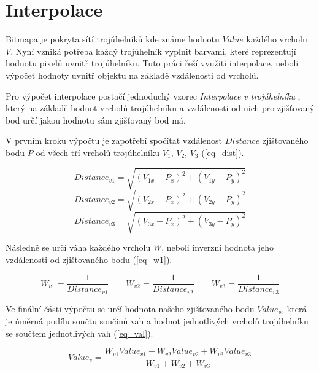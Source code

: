 \documentclass[czech,bachelor,dept460,male,csharp,cpdeclaration]{diploma}
\begin{document}
	\section{Interpolace}
	
	Bitmapa je pokryta sítí trojúhelníků kde známe hodnotu $Value$ každého vrcholu $V$. Nyní vzniká potřeba každý trojúhelník vyplnit barvami, které reprezentují hodnotu pixelů uvnitř trojúhelníku. Tuto práci řeší využití interpolace, neboli výpočet hodnoty uvnitř objektu na základě vzdálenosti od vrcholů.
	
	Pro výpočet interpolace postačí jednoduchý vzorec \emph{Interpolace v trojúhelníku} \cite{interp}, který na základě hodnot vrcholů trojúhelníku a vzdálenosti od nich pro zjišťovaný bod určí jakou hodnotu sám zjišťovaný bod má.
	
	
	V prvním kroku výpočtu je zapotřebí spočítat vzdálenost $Distance$ zjišťovaného bodu $P$ od všech tří vrcholů trojúhelníku $V_1$, $V_2$, $V_3$ (\ref{eq_dist}). 
	
	\begin{displaymath}
		Distance_{v1} =\sqrt{(V_{1x}-P_x)^2+(V_{1y}-P_y)^2}
	\end{displaymath}
	\begin{displaymath}
		Distance_{v2} =\sqrt{(V_{2x}-P_x)^2+(V_{2y}-P_y)^2}
	\end{displaymath}
	\begin{equation}\label{eq_dist}
		Distance_{v3} =\sqrt{(V_{3x}-P_x)^2+(V_{3y}-P_y)^2}
	\end{equation}
	
	Následně se určí váha každého vrcholu $W$, neboli inverzní hodnota jeho vzdálenosti od zjišťovaného bodu (\ref{eq_w1}).
	
	\begin{equation}\label{eq_w1}
		W_{v1} =\frac{1}{Distance_{v1}}
		\quad\mathrm{ }\quad 
		W_{v2} =\frac{1}{Distance_{v2}}
		\quad\mathrm{ }\quad 
		W_{v3} =\frac{1}{Distance_{v3}} 
	\end{equation}
	
	Ve finální části výpočtu se určí hodnota našeho zjišťovaného bodu $Value_p$, která je úměrná podílu součtu součinů vah a hodnot jednotlivých vrcholů trojúhelníku se součtem jednotlivých vah (\ref{eq_val}).
	
	\begin{equation}\label{eq_val}
		Value_v = \frac{W_{v1}Value_{v1} + W_{v2}Value_{v2} + W_{v3}Value_{v3}}{W_{v1} + W_{v2} + W_{v3}}
	\end{equation}
	
\end{document}
